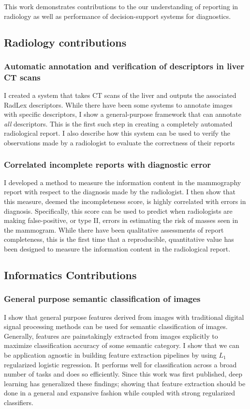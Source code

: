 This work demonstrates contributions to the our understanding of reporting in radiology as well as performance of decision-support systems for diagnostics.

\subsection{Radiology contributions}

\subsubsection{Automatic annotation and verification of descriptors in liver CT scans}
I created a system that takes CT scans of the liver and outputs the associated RadLex descriptors. While there have been some systems to annotate images with specific descriptors, I show a general-purpose framework that can annotate \emph{all} descriptors. This is the first such step in creating a completely automated radiological report. I also describe how this system can be used to verify the observations made by a radiologist to evaluate the correctness of their reports

\subsubsection{Correlated incomplete reports with diagnostic error}
I developed a method to measure the information content in the mammography report with respect to the diagnosis made by the radiologist. I then show that this measure, deemed the incompleteness score, is highly correlated with errors in diagnosis. Specifically, this score can be used to predict when radiologists are making false-positive, or type II, errors in estimating the risk of masses seen in the mammogram. While there have been qualitative assessments of report completeness, this is the first time that a reproducible, quantitative value has been designed to measure the information content in the radiological report.


\subsection{Informatics Contributions}

\subsubsection{General purpose semantic classification of images}
I show that general purpose features derived from images with traditional digital signal processing methods can be used for semantic classification of images. Generally, features are painstakingly extracted from images explicitly to maximize classification accuracy of some semantic category. I show that we can be application agnostic in building feature extraction pipelines by using $L_1$ regularized logistic regression. It performs well for classification across a broad number of tasks and does so efficiently. Since this work was first published, deep learning has generalized these findings; showing that feature extraction should be done in a general and expansive fashion while coupled with strong regularized classifiers.

